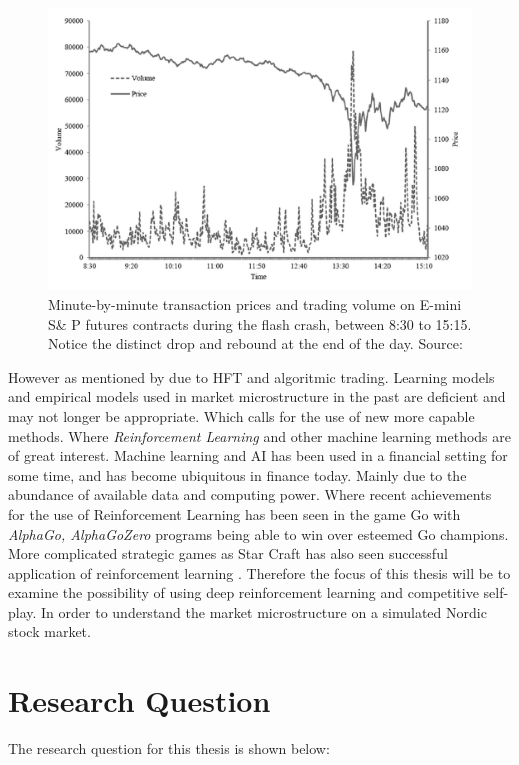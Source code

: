 \documentclass{kththesis}
\theoremstyle{definition}
\begin{document}
\begin{figure}[ht]
    \centering
    \includegraphics[scale=.7]{flashcrash.PNG}
    \caption{Minute-by-minute transaction prices and trading volume on E-mini S\& P futures contracts during the flash crash, between 8:30 to 15:15. Notice the distinct drop and rebound at the end of the day. Source: \textcite{kirilenko2017flash} }
    \label{fig:1}
\end{figure}

However as mentioned by \textcite{o2015high} due to HFT and algoritmic trading. Learning models and empirical models used in market microstructure in the past are deficient and may not longer be appropriate. Which calls for the use of new more capable methods. Where \textit{Reinforcement Learning} and other machine learning methods are of great interest. Machine learning and AI has been used in a financial setting for some time, and has become ubiquitous in finance today. Mainly due to the abundance of available data and computing power. 
\newline
\newline
Where recent achievements for the use of Reinforcement Learning has been seen in the game Go with \textit{AlphaGo, AlphaGoZero} \parencite{silver2016mastering} programs being able to win over esteemed Go champions. More complicated strategic games as Star Craft has also seen successful application of reinforcement learning \parencite{vinyals2017starcraft}. Therefore the focus of this thesis will be to examine the possibility of using deep reinforcement learning and competitive self-play. In order to understand the market microstructure on a simulated Nordic stock market.

\section{Research Question}
The research question for this thesis is shown below:
\end{document}
